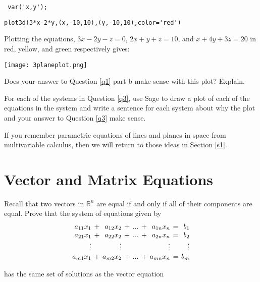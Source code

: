 \verb" var('x,y'); "

\verb"plot3d(3*x-2*y,(x,-10,10),(y,-10,10),color='red') "

Plotting the equations, $3x-2y-z=0$, $2x+y+z=10$, and $x+4y+3z=20$ in red, yellow, and green respectively gives:

\begin{center}\texttt{[image: 3planeplot.png]}\end{center}

\begin{question} Does your answer to Question \ref{q1} part b make sense with this plot? Explain.
\end{question}

\bq For each of the systems in Question \ref{q3}, use Sage to draw a plot of each of the equations in the system and write a sentence for each system about why the plot and your answer to Question \ref{q3} make sense.
\eq

If you remember parametric equations of lines and planes in space from multivariable calculus, then we will return to those ideas in Section \ref{s1}.

\section{Vector and Matrix Equations}
Recall that two vectors in $\mathbb{R}^n$ are equal if and only if all of their components are equal.
\bq\label{q41} Prove that the system of equations given by
\begin{equation*}
\setlength{\arraycolsep}{2pt}
\begin{array}{rcrcrcrcr}
  a_{11} x_1  &+& a_{12} x_2 &+& ... &+&  a_{1n}x_n &=& b_1 \\ %
  a_{21} x_1  &+& a_{22} x_2 &+& ... &+&  a_{2n}x_n &=& b_2 \\
  \vdots  & & \vdots & &  & &  \vdots && \vdots \\
  a_{m1} x_1  &+& a_{m2} x_2 &+& ... &+&  a_{mn}x_n &=& b_m
\end{array}
\end{equation*}

has the same set of solutions as the vector equation

